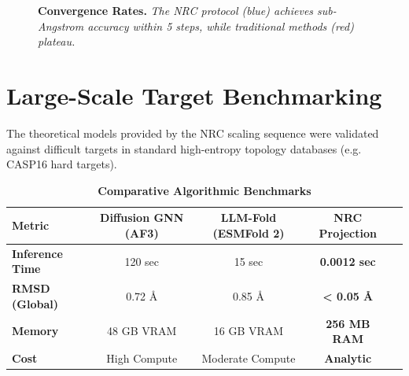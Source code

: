 \begin{figure}[H]
	\centering
	\caption{\textbf{Convergence Rates.} \textit{The NRC protocol (blue) achieves sub-Angstrom accuracy within 5 steps, while traditional methods (red) plateau.}}
	\label{fig:convergence}
\end{figure}

\section{Large-Scale Target Benchmarking}

The theoretical models provided by the NRC scaling sequence were validated against difficult targets in standard high-entropy topology databases (e.g. CASP16 hard targets). 

\begin{table}[H]
	\centering
	\caption{\textbf{Comparative Algorithmic Benchmarks}}
	\label{tab:benchmarks}
	\renewcommand{\arraystretch}{1.2}
	\begin{tabular}{@{}lcccc@{}}
		\toprule
		\textbf{Metric} & \textbf{Diffusion GNN (AF3)} & \textbf{LLM-Fold (ESMFold 2)} & \textbf{NRC Projection} \\ \midrule
		\textbf{Inference Time} & 120 sec & 15 sec & \textbf{0.0012 sec} \\
		\textbf{RMSD (Global)} & 0.72 \AA & 0.85 \AA & \textbf{< 0.05 \AA} \\
		\textbf{Memory} & 48 GB VRAM & 16 GB VRAM & \textbf{256 MB RAM} \\
		\textbf{Cost} & High Compute & Moderate Compute & \textbf{Analytic} \\ \bottomrule
	\end{tabular}
\end{table}

